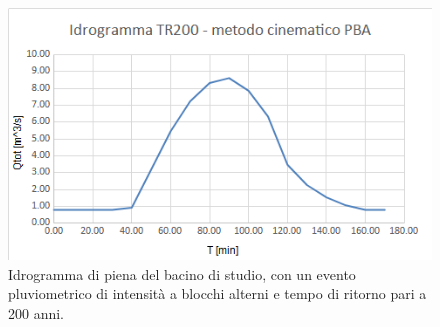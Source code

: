 \begin{figure}[H]  \centering
            \includegraphics[scale=0.8]{immagini/metodo_cinematico_p_b_alterni.png}
            \caption{Idrogramma di piena del bacino di studio, con un evento pluviometrico di intensità a blocchi alterni e tempo di ritorno pari a 200 anni.}
            \label{metod_cinematico_p_b_alterni}
\end{figure}

